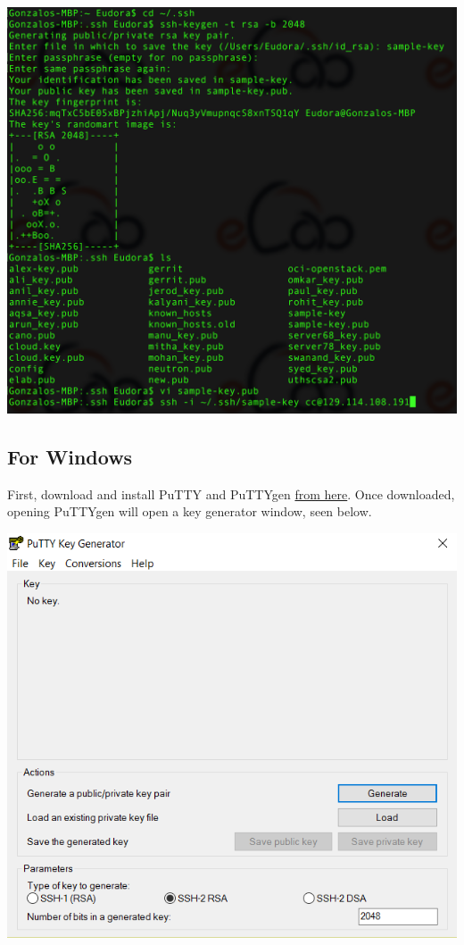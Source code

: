 {\includegraphics[width=\columnwidth]{images/chameleon/ssh1.png}}

\subsection{For Windows}\label{for-windows}

First, download and install PuTTY and PuTTYgen
\href{http://www.chiark.greenend.org.uk/~sgtatham/putty/}{from here}.
Once downloaded, opening PuTTYgen will open a key generator window, seen
below.

\includegraphics[width=\columnwidth]{images/chameleon/putty2.png}

